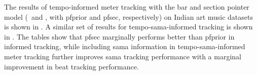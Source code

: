 The results of tempo-informed meter tracking with the bar and section pointer model (\bpmodel\ and \spmodel, with \acrshort{pfprior} and \acrshort{pfsec}, respectively) on Indian art music datasets is shown in . A similar set of results for tempo-sama-informed tracking is shown in . The tables show that \acrshort{pfsec} marginally performs better than \acrshort{pfprior} in informed tracking, while including \gls{sama} information in tempo-sama-informed meter tracking further improves \gls{sama} tracking performance with a marginal improvement in beat tracking performance. 
% 
